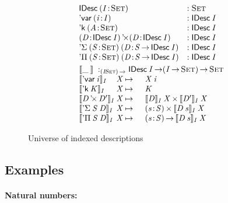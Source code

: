 \begin{figure}

\[\stk{\begin{array}{@{}ll}
\IDesc{(\Bhab{\V{I}}{\Set})} &: \Set \\
\DVar{(\Bhab{\V{i}}{\V{I}})} &: \IDesc{\V{I}} \\
\DConst{(\Bhab{\V{A}}{\Set})} &:\IDesc{\V{I}}       \\
\DProd{(\Bhab{\V{D}}{\IDesc{\V{I}}})}{(\Bhab{\V{D}}{\IDesc{\V{I}}})}
  & :\IDesc{\V{I}}       \\
\DSigma{(\Bhab{\V{S}}{\Set})}{(\Bhab{\V{D}}{\V{S}\To\IDesc{\V{I}}})}
& : \IDesc{\V{I}}  \\
\DPi{(\Bhab{\V{S}}{\Set})}{(\Bhab{\V{D}}{\V{S}\To\IDesc{\V{I}}})}
& : \IDesc{\V{I}}  \\
\end{array}\smallskip \\
\idescop{\_\:}{}{} :_{\PI{\V{I}}{\Set}} \IDesc{\V{I}} \To (\V{\V{I}} \To \Set) \To \Set                  \\
\begin{array}{@{}l@{\V{X}}@{\:\mapsto\:\:}ll}
\idescop{\DVar{\V{i}}}{\V{I}}{&}      &  \V{X}\: \V{i}                                           \\
\idescop{\DConst{\V{K}}}{\V{I}}{&}    &  \V{K}                                                   \\
\idescop{\DProd{\V{D}}{\V{D'}}}{\V{I}}{&} &  \TIMES{\idescop{\V{D}}{\V{I}}{\V{X}}}{\idescop{\V{D'}}{\V{I}}{\V{X}}}       \\
\idescop{\DSigma{\V{S}}{\V{D}}}{\V{I}}{&} &  \SIGMA{\V{s}}{\V{S}} \idescop{\V{D}\: \V{s}}{\V{I}}{\V{X}}                    \\
\idescop{\DPi{\V{S}}{\V{D}}}{\V{I}}{&}    &  \PI{\V{s}}{\V{S}} \idescop{\V{D}\: \V{s}}{\V{I}}{\V{X}}            
\end{array}
}
\]

\caption{Universe of indexed descriptions}
\label{fig:idesc}

\end{figure}



\subsection{Examples}
\label{sec:idesc-examples}

\paragraph{Natural numbers:}

